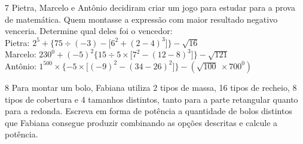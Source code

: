 
\num{7} Pietra, Marcelo e Antônio decidiram criar um jogo para estudar para a
prova de matemática. Quem montasse a expressão com maior resultado
negativo venceria. Determine qual deles foi o vencedor: \\

Pietra:
$2^{5} + \{ 75 \div ( - 3 ) - \lbrack 6^{2} + ( 2 - 4 )^{3} \rbrack \} - \sqrt{16}$
 \\

Marcelo:
$230^{0} + ( - 5)^2 \{ 15 \div 5 \times \lbrack 7^{2} - ( 12 - 8 )^{3} \rbrack \} - \sqrt{121}$
 \\

Antônio:
$1^{500} \times \{ - 5 \times \lbrack ( - 9 )^{2} - ( 34 - 26 )^{2} \rbrack \} - (\sqrt{100}\  \times 700^{0})$



\num{8} Para montar um bolo, Fabiana utiliza 2 tipos de massa, 16 tipos de
recheio, 8 tipos de cobertura e 4 tamanhos distintos, tanto para a parte
retangular quanto para a redonda. Escreva em forma de potência a
quantidade de bolos distintos que Fabiana consegue produzir combinando
as opções descritas e calcule a potência.


